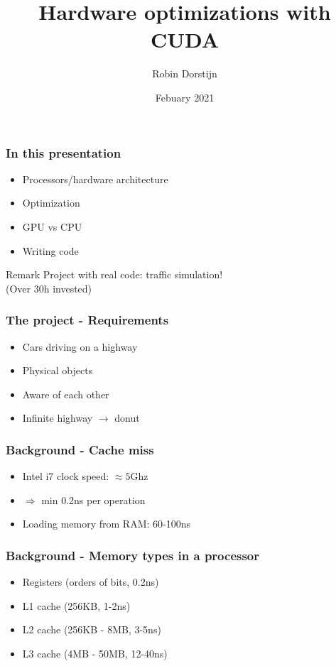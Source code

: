\documentclass[t]{beamer}
\title{Hardware optimizations with CUDA}
\author{Robin Dorstijn}
\institute{Universität Heidelberg}
\date{Febuary 2021}
\begin{document}
\expandafter\def\expandafter\insertshorttitle\expandafter{%
  \insertshorttitle\hfill%
  \insertframenumber\,/\,\inserttotalframenumber}

\frame{\titlepage}

\begin{frame}
    \frametitle{In this presentation}
    \begin{itemize}
        \item Processors/hardware architecture
        \item Optimization
        \item GPU vs CPU
        \item Writing code
    \end{itemize}
    \begin{block}{Remark}
        Project with \alert{real} code: traffic simulation! \\
        (Over 30h invested)
    \end{block}
\end{frame}

\begin{frame}
    \frametitle{The project - Requirements}
    \begin{itemize}
        \item Cars driving on a highway
        \item Physical objects
        \item Aware of each other
        \item Infinite highway $\rightarrow$ donut
    \end{itemize}
\end{frame}

\begin{frame}
    \frametitle{Background - Cache miss}
    \begin{itemize}
        \item Intel i7 clock speed: $\approx 5$Ghz
        \item $\Rightarrow$ min 0.2ns per operation
        \item Loading memory from RAM: 60-100ns
    \end{itemize}
\end{frame}

\begin{frame}
    \frametitle{Background - Memory types in a processor}
    \begin{itemize}
        \item Registers (orders of bits, 0.2ns)
        \item L1 cache (256KB, 1-2ns)
        \item L2 cache (256KB - 8MB, 3-5ns)
        \item L3 cache (4MB - 50MB, 12-40ns)
    \end{itemize}
\end{frame}
\end{document}
